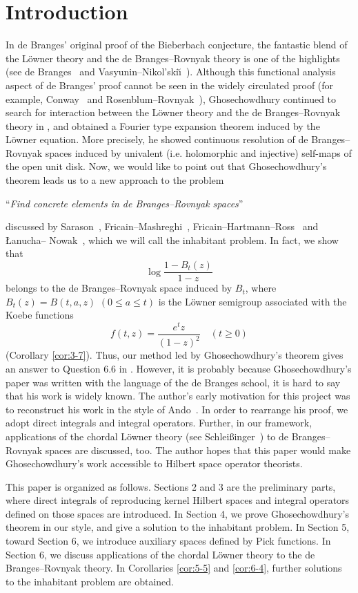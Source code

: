 \documentclass[12pt]{article}
\numberwithin{equation}{section}
\begin{document}
\section{Introduction}
In de Branges' original proof of the Bieberbach conjecture, 
the fantastic blend of the L\"{o}wner theory and the de Branges--Rovnyak theory is one of the highlights (see de Branges~\cite{de Branges2} and Vasyunin--Nikol'ski\u{\i}~\cite{VN1, VN2}). 
Although this functional analysis aspect of de Branges' proof cannot be seen in 
the widely circulated proof (for example, Conway~\cite{Conway} and Rosenblum--Rovnyak~\cite{RR}),  
Ghosechowdhury continued to search for 
interaction between 
the L\"{o}wner theory and the de Branges--Rovnyak theory in \cite{G1, G2}, 
and obtained a Fourier type expansion theorem induced 
by the L\"{o}wner equation. 
More precisely, he showed continuous resolution 
of de Branges--Rovnyak spaces induced by univalent (i.e. holomorphic and injective) self-maps of the open unit disk.  
Now, we would like to point out that 
Ghosechowdhury's theorem leads us to a new approach to the problem 
\begin{center}
``\textit{Find concrete 
elements in de Branges--Rovnyak spaces}'' 
\end{center}
discussed by Sarason~\cite{Sarason}, 
Fricain--Mashreghi~\cite{FM}, Fricain--Hartmann--Ross~\cite{FHR} and {\L}anucha--
Nowak~\cite{LN}, which we will call the inhabitant problem. 
In fact, 
we show that
\[
\log \frac{1-B_t(z)}{1-z}
\]
belongs to the de Branges--Rovnyak space induced by $B_t$, 
where $B_t(z)=B(t,a,z)$ $(0\leq a \leq t)$ is the L\"{o}wner semigroup 
associated with the Koebe functions
\[
f(t,z)=\frac{e^tz}{(1-z)^2}\quad (t\geq 0)
\]
(Corollary \ref{cor:3-7}). 
Thus, our method led by Ghosechowdhury's theorem gives an answer to Question 6.6 in \cite{FHR}. 
However, it is probably because Ghosechowdhury's paper was written with the language of the de Branges school, 
it is hard to say that his work is widely known.  
The author's early motivation for this project was to reconstruct his work 
in the style of Ando~\cite{Ando}. 
In order to rearrange his proof, we adopt direct integrals and integral operators. 
Further, in our framework, 
applications of the chordal L\"{o}wner theory (see Schlei{\ss}inger~\cite{Sch}) to de Branges--Rovnyak spaces are discussed, too. 
The author hopes that this paper  
would make Ghosechowdhury's work accessible 
to Hilbert space operator theorists. 

This paper is organized as follows. 
Sections 2 and 3 are the preliminary parts, where direct integrals of reproducing kernel Hilbert spaces and 
integral operators defined on those spaces are introduced. 
In Section 4, 
we prove Ghosechowdhury's theorem in our style, and give a solution to the inhabitant problem.  
In Section 5, toward Section 6, we introduce auxiliary spaces defined by Pick functions. 
In Section 6, 
we discuss applications of the chordal L\"{o}wner theory to the de Branges--Rovnyak theory. 
In Corollaries \ref{cor:5-5} and \ref{cor:6-4}, further solutions to the inhabitant problem are obtained. 
\end{document}
